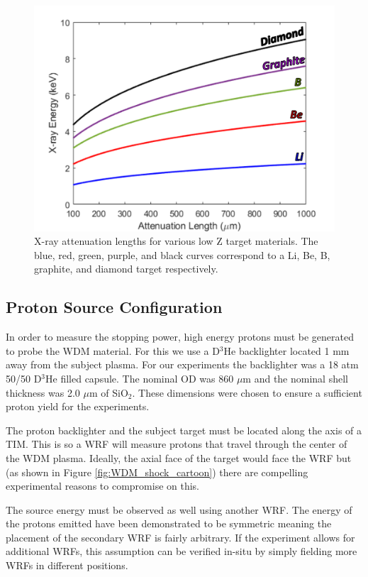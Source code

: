 \begin{figure}[!h]
    \centering
    \includegraphics[scale=0.7]{Figures/xrayAttenuationLengths.pdf}
    \caption[X-ray Attenuation Lengths]{X-ray attenuation lengths for various low Z target materials. The blue, red, green, purple, and black curves correspond to a Li, Be, B, graphite, and diamond target respectively.}
    \label{fig:xrayAttenuation}
\end{figure}

\subsection{Proton Source Configuration}

In order to measure the stopping power, high energy protons must be generated to probe the WDM material. For this we use a D$^3$He backlighter located 1 mm away from the subject plasma. For our experiments the backlighter was a 18 atm 50/50 D$^3$He filled capsule. The nominal OD was 860 $\mu$m and the nominal shell thickness was 2.0 $\mu$m of SiO$_2$. These dimensions were chosen to ensure a sufficient proton yield for the experiments.

The proton backlighter and the subject target must be located along the axis of a TIM. This is so a WRF will measure protons that travel through the center of the WDM plasma. Ideally, the axial face of the target would face the WRF but (as shown in Figure \ref{fig:WDM_shock_cartoon}) there are compelling experimental reasons to compromise on this.

The source energy must be observed as well using another WRF. The energy of the protons emitted have been demonstrated to be symmetric meaning the placement of the secondary WRF is fairly arbitrary. If the experiment allows for additional WRFs, this assumption can be verified in-situ by simply fielding more WRFs in different positions.

